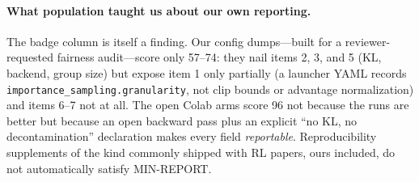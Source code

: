 \paragraph{What population taught us about our own reporting.}
The badge column is itself a finding. Our config dumps---built for a
reviewer-requested fairness audit---score only 57--74: they nail items 2, 3,
and 5 (KL, backend, group size) but expose item 1 only partially (a launcher
YAML records \texttt{importance_sampling.granularity}, not clip bounds or
advantage normalization) and items 6--7 not at all. The open Colab arms score
96 not because the runs are better but because an open backward pass plus an
explicit ``no KL, no decontamination'' declaration makes every field
\emph{reportable}. Reproducibility supplements of the kind commonly shipped
with RL papers, ours included, do not automatically satisfy MIN-REPORT.
